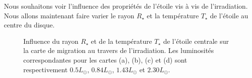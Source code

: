 Nous souhaitons voir l'influence des propriétés de l'étoile vis à vis de l'irradiation. Nous allons maintenant faire varier le rayon $R_\star$ et la température $T_\star$ de l'étoile au centre du disque. 

\begin{figure}[htbp]
\centering
{}
\hfill
{}

\hfill
{}
\caption[Influence des propriétés de l'étoile centrale sur la carte de migration.]{Influence du rayon $R_\star$ et de la
température $T_\star$ de l'étoile centrale sur la carte de migration au travers de l'irradiation. Les luminosités
correspondantes pour les cartes (a), (b), (c) et (d) sont respectivement $0.5\unit{L_\odot}$, $0.84\unit{L_\odot}$,
$1.43\unit{L_\odot}$ et $2.30\unit{L_\odot}$. }\label{fig:map_TTauri}
\end{figure}

